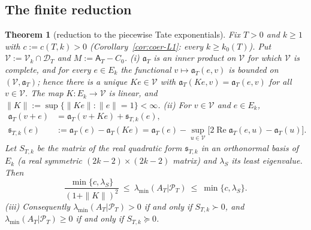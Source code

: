 \documentclass[11pt]{amsart}
\newtheorem{theorem}{Theorem}[section]
\theoremstyle{definition}
\theoremstyle{remark}
\newcommand{\Rel}{\operatorname{Re}}
\newcommand{\PT}{\mathcal P_T}
\newcommand{\lamA}{\lambda_{\min}(A_T|\PT)}
\newcommand{\Aconst}{\mathsf A_T}
\begin{document}
\subsection{The finite reduction}\label{subsec:coer-schur}

\begin{theorem}[reduction to the piecewise Tate exponentials]\label{thm:coer-schur}
Fix $T>0$ and $k\ge1$ with $c:=c(T,k)>0$ (Corollary~\ref{cor:coer-L1}: every $k\ge k_0(T)$). Put
$\mathcal V:=\mathcal V_k\cap\mathcal D_T$ and $M:=\Aconst-C_0$.
\emph{(i)} $\mathfrak a_T$ is an inner product on $\mathcal V$ for which $\mathcal V$ is complete, and for every
$e\in E_k$ the functional $v\mapsto\mathfrak a_T(e,v)$ is bounded on $(\mathcal V,\mathfrak a_T)$; hence there is a unique
$Ke\in\mathcal V$ with $\mathfrak a_T(Ke,v)=\mathfrak a_T(e,v)$ for all $v\in\mathcal V$. The map $K:E_k\to\mathcal V$ is linear,
and $\|K\|:=\sup\{\|Ke\|:\|e\|=1\}<\infty$.
\emph{(ii)} For $v\in\mathcal V$ and $e\in E_k$,
\begin{equation}\label{eq:coer-schur}
\begin{split}
\mathfrak a_T(v+e)&=\mathfrak a_T(v+Ke)+\mathfrak s_{T,k}(e),\\
\mathfrak s_{T,k}(e)&:=\mathfrak a_T(e)-\mathfrak a_T(Ke)=\mathfrak a_T(e)-\sup_{u\in\mathcal V}\big[2\Rel\mathfrak a_T(e,u)-\mathfrak a_T(u)\big].
\end{split}
\end{equation}
Let $S_{T,k}$ be the matrix of the real quadratic form $\mathfrak s_{T,k}$ in an orthonormal basis of $E_k$ (a
real symmetric $(2k-2)\times(2k-2)$ matrix) and $\lambda_S$ its least eigenvalue. Then
\begin{equation}\label{eq:coer-sandwich}
\frac{\min\{c,\lambda_S\}}{(1+\|K\|)^2}\ \le\ \lamA\ \le\ \min\{c,\lambda_S\}.
\end{equation}
\emph{(iii)} Consequently $\lamA>0$ if and only if $S_{T,k}\succ0$, and $\lamA\ge0$ if and only if $S_{T,k}\succeq0$.
\end{theorem}
\end{document}
